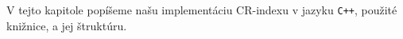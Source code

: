 
V tejto kapitole popíšeme našu implementáciu CR-indexu v jazyku \texttt{C++}, použité knižnice, a jej štruktúru.

